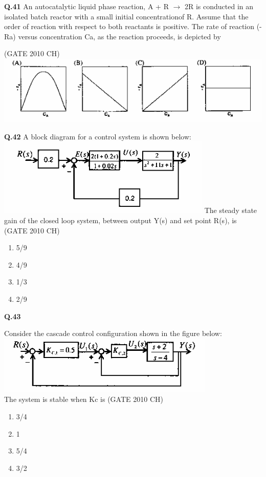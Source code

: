 \documentclass[journal,12pt,onecolumn]{exam}
\theoremstyle{remark}
\begin{document}
\noindent
\textbf{Q.41}
 An autocatalytic liquid phase reaction, A + R $\rightarrow$ 2R is conducted in an isolated batch reactor with a small initial concentrationof R. Assume that the order of reaction with respect to both reactants is positive. The rate of reaction (-Ra) versus concentration Ca, as the reaction proceeds, is depicted by 

\hfill{(GATE 2010 CH)}\\
 \includegraphics[width=1.0\linewidth]{images/Q.41 options.png}
      

\noindent
\textbf{Q.42}
  A block diagram for a control system is shown below:\\
 \includegraphics[width=0.5\linewidth]{images/Q.42 image.png}
      The steady state gain of the closed loop system, between output Y(s) and set point R(s), is 
  \hfill{(GATE 2010 CH)}\\

\begin{enumerate}
    \item 5/9
    \item 4/9
    \item 1/3
    \item 2/9
    
\end{enumerate}

   \noindent
   \textbf{Q.43}
   
   Consider the cascade control configuration shown in the figure below:\\
 \includegraphics[width=0.5\linewidth]{images/Q.43 image.png}\\
 
     The system is stable when Kc is
\hfill{(GATE 2010 CH)}\\
     \begin{enumerate}
         \item 3/4
         \item 1
         \item 5/4
         \item 3/2
         
     \end{enumerate}
\end{document}
